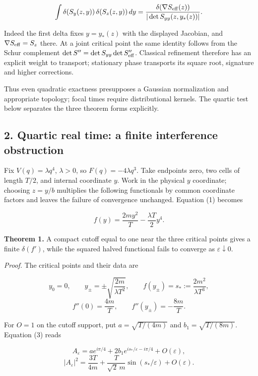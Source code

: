 \documentclass[11pt,a4paper]{article}
\begin{document}
\[
\int\delta(S_y(z,y))\,\delta(S_z(z,y))\,dy
=\frac{\delta(\nabla S_{\rm eff}(z))}
{|\det S_{yy}(z,y_*(z))|}.
\]

Indeed the first delta fixes \(y=y_*(z)\) with the displayed Jacobian,
and \(\nabla S_{\rm eff}=S_z\) there. At a joint critical point the same
identity follows from the Schur complement
\(\det S''=\det S_{yy}\det S_{\rm eff}''\). Classical refinement
therefore has an explicit weight to transport; stationary phase
transports its square root, signature and higher corrections.

Thus even quadratic exactness presupposes a Gaussian normalization and
appropriate topology; focal times require distributional kernels. The
quartic test below separates the three theorem forms explicitly.

\hypertarget{quartic-real-time-a-finite-interference-obstruction}{%
\subsection{2. Quartic real time: a finite interference
obstruction}\label{quartic-real-time-a-finite-interference-obstruction}}

Fix \(V(q)=\lambda q^4\), \(\lambda>0\), so \(F(q)=-4\lambda q^3\). Take
endpoints zero, two cells of length \(T/2\), and internal coordinate
\(y\). Work in the physical \(y\) coordinate; choosing \(z=y/b\)
multiplies the following functionals by common coordinate factors and
leaves the failure of convergence unchanged. Equation (1) becomes

\[
f(y)=\frac{2my^2}{T}-\frac{\lambda T}{2}y^4.
\]

\textbf{Theorem 1.} A compact cutoff equal to one near the three
critical points gives a finite \(\delta(f')\), while the squared halved
functional fails to converge as \(\varepsilon\downarrow0\).

\emph{Proof.} The critical points and their data are

\[
y_0=0,\qquad y_\pm=\pm\sqrt{\frac{2m}{\lambda T^2}},\qquad
f(y_\pm)=s_*:=\frac{2m^2}{\lambda T^3},
\] \[
f''(0)=\frac{4m}{T},\qquad f''(y_\pm)=-\frac{8m}{T}.
\]

For \(O=1\) on the cutoff support, put \(a=\sqrt{T/(4m)}\) and
\(b_1=\sqrt{T/(8m)}\). Equation (3) reads

\[
A_\varepsilon=a e^{i\pi/4}
+2b_1 e^{is_*/\varepsilon-i\pi/4}+O(\varepsilon),
\] \[
|A_\varepsilon|^2=
\frac{3T}{4m}+\frac{T}{\sqrt2\,m}
\sin(s_*/\varepsilon)+O(\varepsilon). \tag{4}
\]
\end{document}
